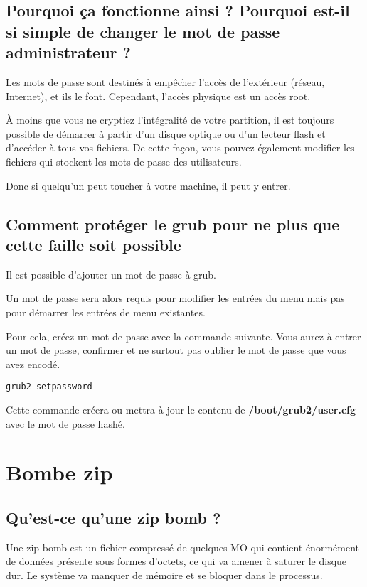 \documentclass[a4paper, 12pt]{article}
\begin{document}
   \subsection{Pourquoi ça fonctionne ainsi ? Pourquoi est-il si simple de changer le mot de passe administrateur ?} 
   \begin{flushleft}
       \noindent Les mots de passe sont destinés à empêcher l'accès de l'extérieur (réseau, Internet), et ils le font. Cependant, l'accès physique est un accès root.
       \item À moins que vous ne cryptiez l'intégralité de votre partition, il est toujours possible de démarrer à partir d'un disque optique ou d'un lecteur flash et d'accéder à tous vos fichiers. De cette façon, vous pouvez également modifier les fichiers qui stockent les mots de passe des utilisateurs.
       \item Donc si quelqu'un peut toucher à votre machine, il peut y entrer.
   \end{flushleft}

   \subsection{Comment protéger le grub pour ne plus que cette faille soit possible} 
   \begin{flushleft}
       \noindent Il est possible d'ajouter un mot de passe à grub.
       \item Un mot de passe sera alors requis pour modifier les entrées du menu mais pas pour démarrer les entrées de menu existantes. 
       \item Pour cela, créez un mot de passe avec la commande suivante. Vous aurez à entrer un mot de passe, confirmer et ne surtout pas oublier le mot de passe que vous avez encodé.
       \begin{lstlisting}
grub2-setpassword
       \end{lstlisting}
       \item Cette commande créera ou mettra à jour le contenu de \textbf{/boot/grub2/user.cfg} avec le mot de passe hashé. \cite{Howtopro9:online}
       
   \end{flushleft}
   \section{Bombe zip}
   		\subsection{Qu'est-ce qu'une zip bomb ?}
         Une zip bomb est un fichier compressé de quelques MO qui contient énormément de données présente sous formes d'octets, ce qui va amener à saturer le disque dur. Le système va manquer de mémoire et se bloquer dans le processus.
\end{document}
